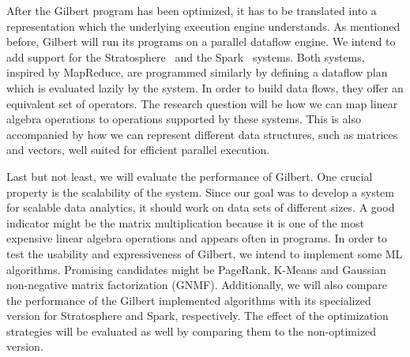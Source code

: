 After the Gilbert program has been optimized, it has to be translated into a representation which the underlying execution engine understands.
As mentioned before, Gilbert will run its programs on a parallel dataflow engine.
We intend to add support for the Stratosphere~\cite{alexandrov:2011a} and the Spark~\cite{zaharia:2010a} systems.
Both systems, inspired by MapReduce, are programmed similarly by defining a dataflow plan which is evaluated lazily by the system.
In order to build data flows, they offer an equivalent set of operators.
The research question will be how we can map linear algebra operations to operations supported by these systems.
This is also accompanied by how we can represent different data structures, such as matrices and vectors, well suited for efficient parallel execution.

Last but not least, we will evaluate the performance of Gilbert.
One crucial property is the scalability of the system.
Since our goal was to develop a system for scalable data analytics, it should work on data sets of different sizes.
A good indicator might be the matrix multiplication because it is one of the most expensive linear algebra operations and appears often in programs.
In order to test the usability and expressiveness of Gilbert, we intend to implement some ML algorithms.
Promising candidates might be PageRank, K-Means and Gaussian non-negative matrix factorization (GNMF).
Additionally, we will also compare the performance of the Gilbert implemented algorithms with its specialized version for Stratosphere and Spark, respectively.
The effect of the optimization strategies will be evaluated as well by comparing them to the non-optimized version.